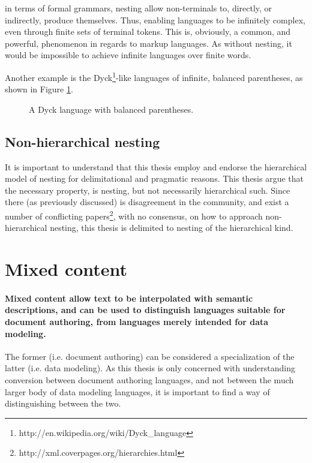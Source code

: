 \documentclass{scrreprt}
\begin{document}
in terms of formal grammars, nesting allow non-terminals to, directly, or indirectly, produce themselves. Thus, enabling languages to be infinitely complex, even through finite sets of terminal tokens. This is, obviously, a common, and powerful, phenomenon in regards to markup languages. As without nesting, it would be impossible to achieve infinite languages over finite words.

Another example is the Dyck\footnote{http://en.wikipedia.org/wiki/Dyck\_language}-like languages of infinite, balanced parentheses, as shown in Figure \ref{fig:mixed-content-nesting}.



\begin{figure}[h]
\centering
{}
\caption{A Dyck language with balanced parentheses.}
\label{fig:mixed-content-nesting}
\end{figure}







\subsection{Non-hierarchical nesting}
\label{sec:non-hierarchical-nesting}
It is important to understand that this thesis employ and endorse the hierarchical model of nesting for delimitational and pragmatic reasons. This thesis argue that the necessary property, is nesting, but not necessarily hierarchical such. Since there (as previously discussed) is disagreement in the community, and exist a number of conflicting papers\footnote{http://xml.coverpages.org/hierarchies.html}, with no consensus, on how to approach non-hierarchical nesting, this thesis is delimited to nesting of the hierarchical kind.











\section{Mixed content}
\label{sec:mixed-content}
\paragraph{Mixed content allow text to be interpolated with semantic descriptions, and can be used to distinguish languages suitable for document authoring, from languages merely intended for data modeling.} The former (i.e. document authoring) can be considered a specialization of the latter (i.e. data modeling). As this thesis is only concerned with understanding conversion between document authoring languages, and not between the much larger body of data modeling languages, it is important to find a way of distinguishing between the two.
\end{document}

